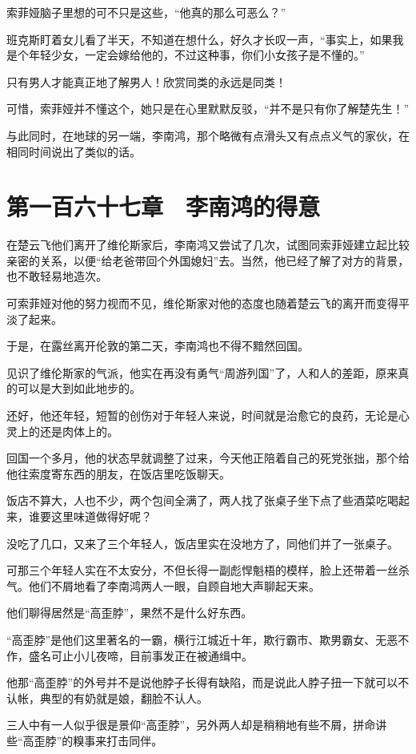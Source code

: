 索菲娅脑子里想的可不只是这些，“他真的那么可恶么？”

班克斯盯着女儿看了半天，不知道在想什么，好久才长叹一声，“事实上，如果我是个年轻少女，一定会嫁给他的，不过这种事，你们小女孩子是不懂的。”

只有男人才能真正地了解男人！欣赏同类的永远是同类！

可惜，索菲娅并不懂这个，她只是在心里默默反驳，“并不是只有你了解楚先生！”

与此同时，在地球的另一端，李南鸿，那个略微有点滑头又有点点义气的家伙，在相同时间说出了类似的话。

\section{第一百六十七章　李南鸿的得意}

在楚云飞他们离开了维伦斯家后，李南鸿又尝试了几次，试图同索菲娅建立起比较亲密的关系，以便“给老爸带回个外国媳妇”去。当然，他已经了解了对方的背景，也不敢轻易地造次。

可索菲娅对他的努力视而不见，维伦斯家对他的态度也随着楚云飞的离开而变得平淡了起来。

于是，在露丝离开伦敦的第二天，李南鸿也不得不黯然回国。

见识了维伦斯家的气派，他实在再没有勇气“周游列国”了，人和人的差距，原来真的可以是大到如此地步的。

还好，他还年轻，短暂的创伤对于年轻人来说，时间就是治愈它的良药，无论是心灵上的还是肉体上的。

回国一个多月，他的状态早就调整了过来，今天他正陪着自己的死党张拙，那个给他往索度寄东西的朋友，在饭店里吃饭聊天。

饭店不算大，人也不少，两个包间全满了，两人找了张桌子坐下点了些酒菜吃喝起来，谁要这里味道做得好呢？

没吃了几口，又来了三个年轻人，饭店里实在没地方了，同他们并了一张桌子。

可那三个年轻人实在不太安分，不但长得一副彪悍魁梧的模样，脸上还带着一丝杀气。他们不屑地看了李南鸿两人一眼，自顾自地大声聊起天来。

他们聊得居然是“高歪脖”，果然不是什么好东西。

“高歪脖”是他们这里著名的一霸，横行江城近十年，欺行霸市、欺男霸女、无恶不作，盛名可止小儿夜啼，目前事发正在被通缉中。

他那“高歪脖”的外号并不是说他脖子长得有缺陷，而是说此人脖子扭一下就可以不认帐，典型的有奶就是娘，翻脸不认人。

三人中有一人似乎很是景仰“高歪脖”，另外两人却是稍稍地有些不屑，拼命讲些“高歪脖”的糗事来打击同伴。

